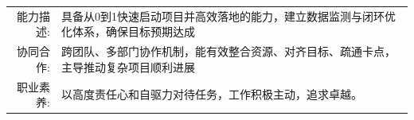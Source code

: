 
\begin{tabular}{rl}
    \textsc{能力描述:} & 具备从0到1快速启动项目并高效落地的能力，建立数据监测与闭环优化体系，确保目标预期达成 \\
    \textsc{协同合作:} & 跨团队、多部门协作机制，能有效整合资源、对齐目标、疏通卡点，主导推动复杂项目顺利进展 \\ 
    \textsc{职业素养:} & 以高度责任心和自驱力对待任务，工作积极主动，追求卓越。\\
\end{tabular}